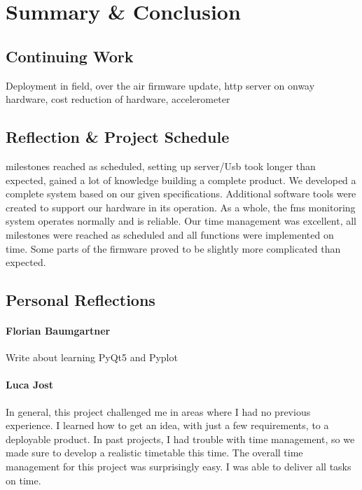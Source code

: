 \chapter{Summary \& Conclusion}

\section{Continuing Work}
Deployment in field, over the air firmware update, http server on onway hardware, cost reduction of hardware, accelerometer

\section{Reflection \& Project Schedule}
milestones reached as scheduled, setting up server/Usb took longer than expected, gained a lot of knowledge building a complete product.  
We developed a complete system based on our given specifications. Additional software tools were created to support our hardware in its operation. As a whole, the \acrfull{fms} monitoring system operates normally and is reliable. 
Our time management was excellent, all milestones were reached as scheduled and all functions were implemented on time. Some parts of the firmware proved to be slightly more complicated than expected. 

\newpage
\section{Personal Reflections}

\subsubsection{Florian Baumgartner}
Write about learning PyQt5 and Pyplot

\subsubsection{Luca Jost}
In general, this project challenged me in areas where I had no previous experience. I learned how to get an idea, with just a few requirements, to a deployable product. In past projects, I had trouble with time management, so we made sure to develop a realistic timetable this time. The overall time management for this project was surprisingly easy. I was able to deliver all tasks on time. 